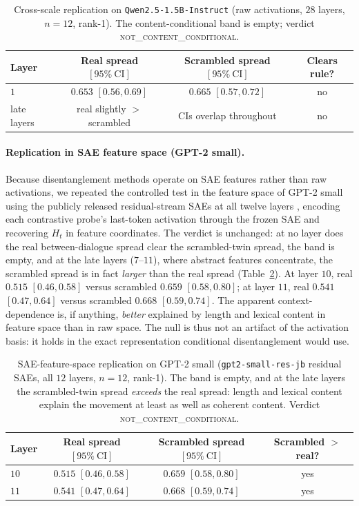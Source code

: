 \begin{table}[t]
\centering
\small
\begin{tabular}{@{}lccc@{}}
\toprule
Layer & Real spread $[95\%\ \text{CI}]$ & Scrambled spread $[95\%\ \text{CI}]$ & Clears rule? \\
\midrule
$1$ & $0.653$ $[0.56,0.69]$ & $0.665$ $[0.57,0.72]$ & no \\
late layers & real slightly $>$ scrambled & CIs overlap throughout & no \\
\bottomrule
\end{tabular}
\caption{Cross-scale replication on \texttt{Qwen2.5-1.5B-Instruct} (raw activations, $28$
layers, $n{=}12$, rank-1). The content-conditional band is empty; verdict
\textsc{not\_content\_conditional}.}
\label{tab:qwen15}
\end{table}

\paragraph{Replication in SAE feature space (GPT-2 small).} Because disentanglement methods
operate on SAE features rather than raw activations, we repeated the controlled test in the
feature space of GPT-2 small using the publicly released residual-stream SAEs at all twelve
layers \citep{cunningham2023sparse, bricken2023monosemanticity}, encoding each contrastive
probe's last-token activation through the frozen SAE and recovering $H_t$ in feature
coordinates. The verdict is unchanged: at no layer does the real between-dialogue spread clear
the scrambled-twin spread, the band is empty, and at the late layers ($7$--$11$), where
abstract features concentrate, the scrambled spread is in fact \emph{larger} than the real
spread (Table~\ref{tab:gpt2sae}). At layer $10$, real $0.515$ $[0.46,0.58]$ versus scrambled
$0.659$ $[0.58,0.80]$; at layer $11$, real $0.541$ $[0.47,0.64]$ versus scrambled $0.668$
$[0.59,0.74]$. The apparent context-dependence is, if anything, \emph{better} explained by
length and lexical content in feature space than in raw space. The null is thus not an artifact
of the activation basis: it holds in the exact representation conditional disentanglement would
use.

\begin{table}[t]
\centering
\small
\begin{tabular}{@{}lccc@{}}
\toprule
Layer & Real spread $[95\%\ \text{CI}]$ & Scrambled spread $[95\%\ \text{CI}]$ & Scrambled $>$ real? \\
\midrule
$10$ & $0.515$ $[0.46,0.58]$ & $0.659$ $[0.58,0.80]$ & yes \\
$11$ & $0.541$ $[0.47,0.64]$ & $0.668$ $[0.59,0.74]$ & yes \\
\bottomrule
\end{tabular}
\caption{SAE-feature-space replication on GPT-2 small (\texttt{gpt2-small-res-jb} residual
SAEs, all $12$ layers, $n{=}12$, rank-1). The band is empty, and at the late layers the
scrambled-twin spread \emph{exceeds} the real spread: length and lexical content explain the
movement at least as well as coherent content. Verdict \textsc{not\_content\_conditional}.}
\label{tab:gpt2sae}
\end{table}

